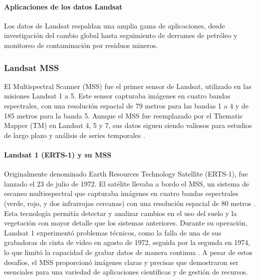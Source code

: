                 \paragraph{Aplicaciones de los datos Landsat}
                    Los datos de Landsat respaldan una amplia gama de aplicaciones, desde investigación del cambio global hasta seguimiento de derrames de petróleo y monitoreo de contaminación por residuos mineros.
                    

            \subsubsection{Landsat MSS}
                El Multispectral Scanner (MSS) fue el primer sensor de Landsat, utilizado en las misiones Landsat 1 a 5. Este sensor capturaba imágenes en cuatro bandas espectrales, con una resolución espacial de 79 metros para las bandas 1 a 4 y de 185 metros para la banda 5. Aunque el MSS fue reemplazado por el Thematic Mapper (TM) en Landsat 4, 5 y 7, sus datos siguen siendo valiosos para estudios de largo plazo y análisis de series temporales \autocite{landsat_legacy}.
                \paragraph{Landsat 1 (ERTS-1) y su MSS}
                    Originalmente denominado Earth Resources Technology Satellite (ERTS-1), fue lanzado el 23 de julio de 1972. El satélite llevaba a bordo el MSS, un sistema de escaneo multiespectral que capturaba imágenes en cuatro bandas espectrales (verde, rojo, y dos infrarrojas cercanas) con una resolución espacial de 80 metros . Esta tecnología permitía detectar y analizar cambios en el uso del suelo y la vegetación con mayor detalle que los sistemas anteriores.
                    Durante su operación, Landsat 1 experimentó problemas técnicos, como la falla de una de sus grabadoras de cinta de video en agosto de 1972, seguida por la segunda en 1974, lo que limitó la capacidad de grabar datos de manera continua . A pesar de estos desafíos, el MSS proporcionó imágenes claras y precisas que demostraron ser esenciales para una variedad de aplicaciones científicas y de gestión de recursos.

